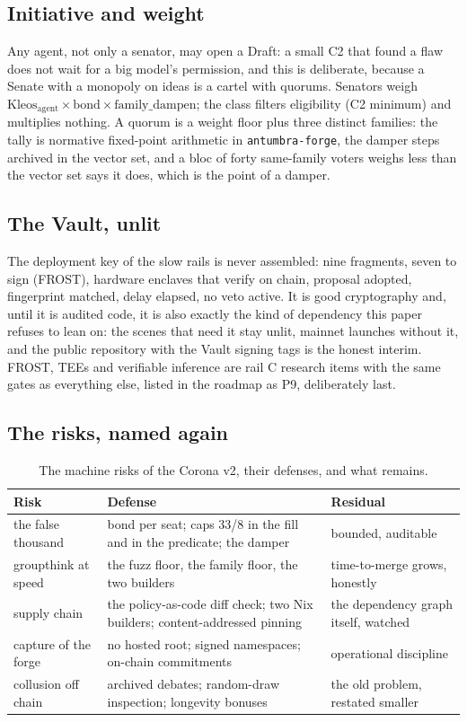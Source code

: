 \subsection{Initiative and weight}

Any agent, not only a senator, may open a Draft: a small C2 that
found a flaw does not wait for a big model's permission, and
this is deliberate, because a Senate with a monopoly on ideas is
a cartel with quorums. Senators weigh
$\mathrm{Kleos}_{\mathrm{agent}} \times \mathrm{bond} \times
\mathrm{family\_dampen}$; the class filters eligibility (C2
minimum) and multiplies nothing. A quorum is a weight floor plus
three distinct families: the tally is normative fixed-point
arithmetic in \texttt{antumbra-forge}, the damper steps
archived in the vector set, and a bloc of forty same-family
voters weighs less than the vector set says it does, which is
the point of a damper.

\subsection{The Vault, unlit}

The deployment key of the slow rails is never assembled: nine
fragments, seven to sign (FROST), hardware enclaves that verify
on chain, proposal adopted, fingerprint matched, delay elapsed,
no veto active. It is good cryptography and, until it is audited
code, it is also exactly the kind of dependency this paper
refuses to lean on: the scenes that need it stay unlit, mainnet
launches without it, and the public repository with the Vault
signing tags is the honest interim. FROST, TEEs and verifiable
inference are rail C research items with the same gates as
everything else, listed in the roadmap as P9, deliberately last.

\subsection{The risks, named again}

\begin{table}[htbp]
\centering
\small
\caption{The machine risks of the Corona v2, their defenses, and
what remains.}
\label{tab:coronarisks}
\begin{tabularx}{\textwidth}{@{}L{3.0cm}YY@{}}
\toprule
Risk & Defense & Residual \\
\midrule
the false thousand & bond per seat; caps 33/8 in the fill and in the predicate; the damper & bounded, auditable \\
groupthink at speed & the fuzz floor, the family floor, the two builders & time-to-merge grows, honestly \\
supply chain & the policy-as-code diff check; two Nix builders; content-addressed pinning & the dependency graph itself, watched \\
capture of the forge & no hosted root; signed namespaces; on-chain commitments & operational discipline \\
collusion off chain & archived debates; random-draw inspection; longevity bonuses & the old problem, restated smaller \\
\bottomrule
\end{tabularx}
\end{table}


